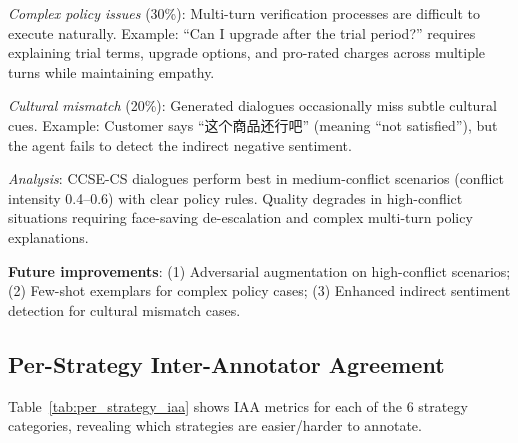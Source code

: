 \documentclass[11pt]{article}
\begin{document}
\textit{Complex policy issues} (30\%): Multi-turn verification processes are difficult to execute naturally. Example: ``Can I upgrade after the trial period?'' requires explaining trial terms, upgrade options, and pro-rated charges across multiple turns while maintaining empathy.

\textit{Cultural mismatch} (20\%): Generated dialogues occasionally miss subtle cultural cues. Example: Customer says ``这个商品还行吧'' (meaning ``not satisfied''), but the agent fails to detect the indirect negative sentiment.

\textit{Analysis}: CCSE-CS dialogues perform best in medium-conflict scenarios (conflict intensity 0.4--0.6) with clear policy rules. Quality degrades in high-conflict situations requiring face-saving de-escalation and complex multi-turn policy explanations.

\textbf{Future improvements}: (1) Adversarial augmentation on high-conflict scenarios; (2) Few-shot exemplars for complex policy cases; (3) Enhanced indirect sentiment detection for cultural mismatch cases.

\subsection{Per-Strategy Inter-Annotator Agreement}

Table~\ref{tab:per_strategy_iaa} shows IAA metrics for each of the 6 strategy categories, revealing which strategies are easier/harder to annotate.
\end{document}

